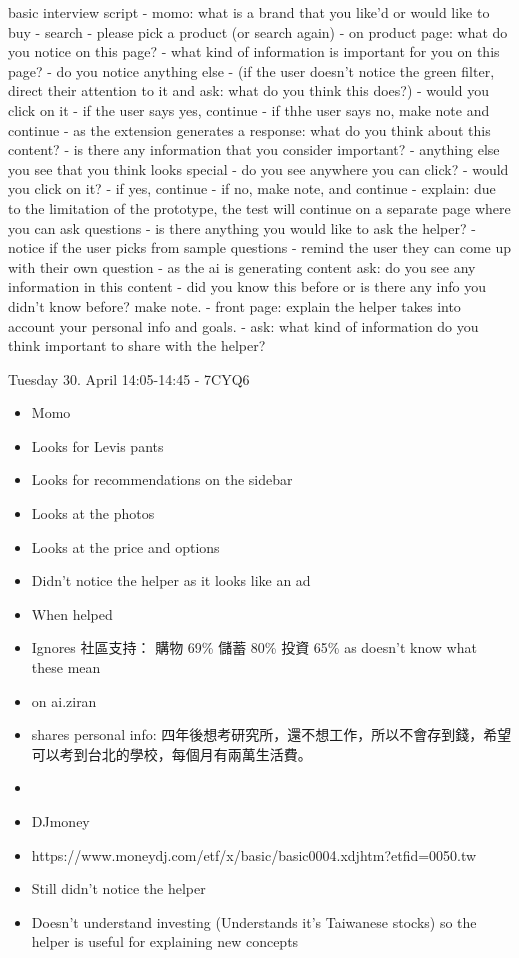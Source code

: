 \documentclass[
  letterpaper,
  DIV=11,
  numbers=noendperiod]{scrartcl}
\providecommand{\tightlist}{%
  \setlength{\itemsep}{0pt}\setlength{\parskip}{0pt}}\usepackage{longtable,booktabs,array}
\begin{document}
basic interview script - momo: what is a brand that you like'd or would
like to buy - search - please pick a product (or search again) - on
product page: what do you notice on this page? - what kind of
information is important for you on this page? - do you notice anything
else - (if the user doesn't notice the green filter, direct their
attention to it and ask: what do you think this does?) - would you click
on it - if the user says yes, continue - if thhe user says no, make note
and continue - as the extension generates a response: what do you think
about this content? - is there any information that you consider
important? - anything else you see that you think looks special - do you
see anywhere you can click? - would you click on it? - if yes, continue
- if no, make note, and continue - explain: due to the limitation of the
prototype, the test will continue on a separate page where you can ask
questions - is there anything you would like to ask the helper? - notice
if the user picks from sample questions - remind the user they can come
up with their own question - as the ai is generating content ask: do you
see any information in this content - did you know this before or is
there any info you didn't know before? make note. - front page: explain
the helper takes into account your personal info and goals. - ask: what
kind of information do you think important to share with the helper?

Tuesday 30. April 14:05-14:45 - 7CYQ6

\begin{itemize}
\tightlist
\item
  Momo
\item
  Looks for Levis pants
\item
  Looks for recommendations on the sidebar
\item
  Looks at the photos
\item
  Looks at the price and options
\item
  Didn't notice the helper as it looks like an ad
\item
  When helped
\item
  Ignores 社區支持： 購物 69\% 儲蓄 80\% 投資 65\% as doesn't know what
  these mean
\item
  on ai.ziran
\item
  shares personal info:
  四年後想考研究所，還不想工作，所以不會存到錢，希望可以考到台北的學校，每個月有兩萬生活費。
\item
\item
  DJmoney
\item
  https://www.moneydj.com/etf/x/basic/basic0004.xdjhtm?etfid=0050.tw
\item
  Still didn't notice the helper
\item
  Doesn't understand investing (Understands it's Taiwanese stocks) so
  the helper is useful for explaining new concepts
\end{itemize}
\end{document}
